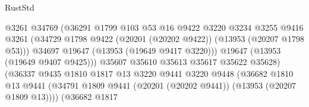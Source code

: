 \begin{lexlean}{RustStd}
\begin{coremodule}
                                            @3261
                                            @34769
                                            (@36291
                                              @1799
                                              @103
                                              @53
                                              @16
                                              @9422
                                              @3220
                                              @3234
                                              @3255
                                              @9416
                                              @3261
                                              (@34729
                                                @1798
                                                @9422
                                                (@20201 (@20202 @9422))
                                                (@13953 (@20207 @1798 @53)))
                                              @34697
                                              @19647
                                              (@13953 (@19649 @9417 @3220)))
                                            @19647
                                            (@13953 (@19649 @9407 @9425)))
                                          @35607
                                          @35610
                                          @35613
                                          @35617
                                          @35622
                                          @35628)
                                        (@36337
                                          @9435
                                          @1810
                                          @1817
                                          @13
                                          @3220
                                          @9441
                                          @3220
                                          @9448
                                          (@36682
                                            @1810
                                            @13
                                            @9441
                                            (@34791
                                              @1809
                                              @9441
                                              (@20201 (@20202 @9441))
                                              (@13953 (@20207 @1809 @13))))
                                          (@36682
                                            @1817

\end{coremodule}
\end{lexlean}
